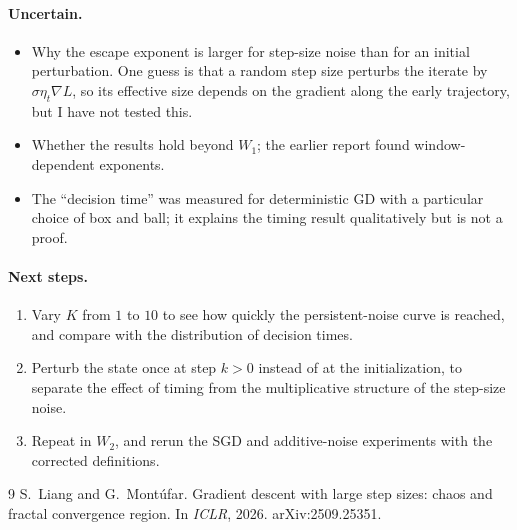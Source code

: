 \documentclass[11pt]{article}
\begin{document}
\paragraph{Uncertain.}
\begin{itemize}
  \item Why the escape exponent is larger for step-size noise than for an initial perturbation. One guess is that a random step size perturbs the iterate by $\sigma\eta_t\nabla L$, so its effective size depends on the gradient along the early trajectory, but I have not tested this.
  \item Whether the results hold beyond $W_1$; the earlier report found window-dependent exponents.
  \item The ``decision time'' was measured for deterministic GD with a particular choice of box and ball; it explains the timing result qualitatively but is not a proof.
\end{itemize}

\paragraph{Next steps.}
\begin{enumerate}
  \item Vary $K$ from $1$ to $10$ to see how quickly the persistent-noise curve is reached, and compare with the distribution of decision times.
  \item Perturb the state once at step $k>0$ instead of at the initialization, to separate the effect of timing from the multiplicative structure of the step-size noise.
  \item Repeat in $W_2$, and rerun the SGD and additive-noise experiments with the corrected definitions.
\end{enumerate}

\begin{thebibliography}{9}
S.~Liang and G.~Mont\'ufar.
\newblock Gradient descent with large step sizes: chaos and fractal convergence region.
\newblock In \emph{ICLR}, 2026. arXiv:2509.25351.
\end{thebibliography}
\end{document}
